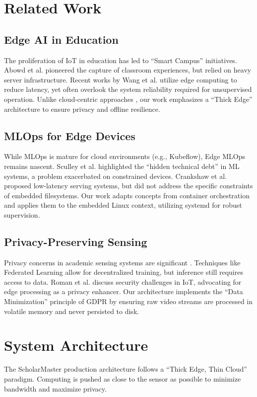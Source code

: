 \documentclass[conference]{IEEEtran}
\begin{document}
\section{Related Work}

\subsection{Edge AI in Education}
The proliferation of IoT in education has led to ``Smart Campus'' initiatives. Abowd et al. \cite{b23} pioneered the capture of classroom experiences, but relied on heavy server infrastructure. Recent works by Wang et al. \cite{b4} utilize edge computing to reduce latency, yet often overlook the system reliability required for unsupervised operation. Unlike cloud-centric approaches \cite{b24}, our work emphasizes a ``Thick Edge'' architecture to ensure privacy and offline resilience.

\subsection{MLOps for Edge Devices}
While MLOps is mature for cloud environments (e.g., Kubeflow), Edge MLOps remains nascent. Sculley et al. \cite{b11} highlighted the ``hidden technical debt'' in ML systems, a problem exacerbated on constrained devices. Crankshaw et al. \cite{b1} proposed low-latency serving systems, but did not address the specific constraints of embedded filesystems. Our work adapts concepts from container orchestration \cite{b5} and applies them to the embedded Linux context, utilizing systemd \cite{b3} for robust supervision.

\subsection{Privacy-Preserving Sensing}
Privacy concerns in academic sensing systems are significant \cite{b21}. Techniques like Federated Learning \cite{b26} allow for decentralized training, but inference still requires access to data. Roman et al. \cite{b21} discuss security challenges in IoT, advocating for edge processing as a privacy enhancer. Our architecture implements the ``Data Minimization'' principle of GDPR \cite{b9} by ensuring raw video streams are processed in volatile memory and never persisted to disk.

\section{System Architecture}
The ScholarMaster production architecture follows a ``Thick Edge, Thin Cloud'' paradigm. Computing is pushed as close to the sensor as possible to minimize bandwidth and maximize privacy.
\end{document}
